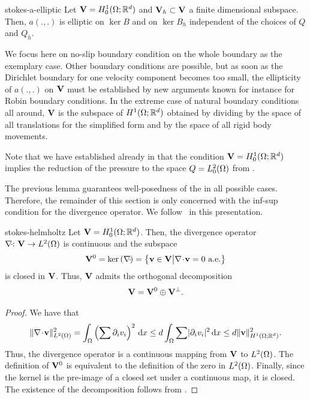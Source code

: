 \begin{Lemma}{stokes-a-elliptic}
  Let $\mathbf V=H^1_0(\Omega; \mathbb R^d)$ and $\mathbf V_h\subset \mathbf V$ a finite dimensional
  subspace. Then, $a(.,.)$ is elliptic on $\ker B$ and on $\ker{B_h}$
  independent of the choices of $Q$ and $Q_h$.
\end{Lemma}

\begin{remark}
  We focus here on no-slip boundary condition on the whole boundary as
  the exemplary case. Other boundary conditions are possible, but as
  soon as the Dirichlet boundary for one velocity component becomes
  too small, the ellipticity of $a(.,.)$ on $\mathbf V$ must be established by
  new arguments known for instance for Robin boundary conditions. In
  the extreme case of natural boundary conditions all around, $\mathbf V$ is
  the subspace of $H^1(\Omega; \mathbb R^d)$ obtained by dividing by the
  space of all translations for the simplified form and by the space
  of all rigid body movements.

  Note that we have established already in
   that the condition
  $\mathbf V=H^1_0(\Omega; \mathbb R^d)$ implies the reduction of the pressure to
  the space $Q = L^2_0(\Omega)$ from
  .
\end{remark}

\begin{intro}
  The previous lemma guarantees well-posedness of the
   in all possible cases. Therefore, the
  remainder of this section is only concerned with the inf-sup
  condition for the divergence operator. We
  follow~\cite{GiraultRaviart86} in this presentation.
\end{intro}

\begin{Lemma}{stokes-helmholtz}
  Let $\mathbf V=H^1_0(\Omega;\mathbb R^d)$. Then, the divergence operator
  $\nabla\!\cdot\!\colon \mathbf V \to L^2(\Omega)$ is continuous and the subspace
  \begin{gather}
    \mathbf V^0 = \operatorname{ker}\left(\nabla\!\cdot\!\right)
    = \bigl\{\mathbf v\in \mathbf V \big|
    \nabla\!\cdot\! \mathbf v = 0 \text{ a.e.} \bigr\}
  \end{gather}
  is closed in $\mathbf V$. Thus, $\mathbf V$ admits the orthogonal decomposition
  \begin{gather}
    \mathbf V = \mathbf V^0\oplus \mathbf V^\perp.
  \end{gather}
\end{Lemma}

\begin{proof}
  We have that
  \begin{gather}
    \lVert\nabla\!\cdot\! \mathbf v\rVert_{L^2(\Omega)}^2
    = \int_\Omega \left(\sum \partial_iv_i\right)^2\,\mathrm{d} x
    \le d \int_\Omega \sum \lvert\partial_iv_i\rvert^2\,\mathrm{d} x
    \le d \lVert\mathbf v\rVert_{H^1(\Omega;\mathbb R^d)}^2.
  \end{gather}
  Thus, the divergence operator is a continuous mapping from $\mathbf V$ to
  $L^2(\Omega)$. The definition of $\mathbf V^0$ is equivalent to the
  definition of the zero in $L^2(\Omega)$. Finally, since the kernel is
  the pre-image of a closed set under a continuous map, it is
  closed. The existence of the decomposition follows from
  .
\end{proof}

